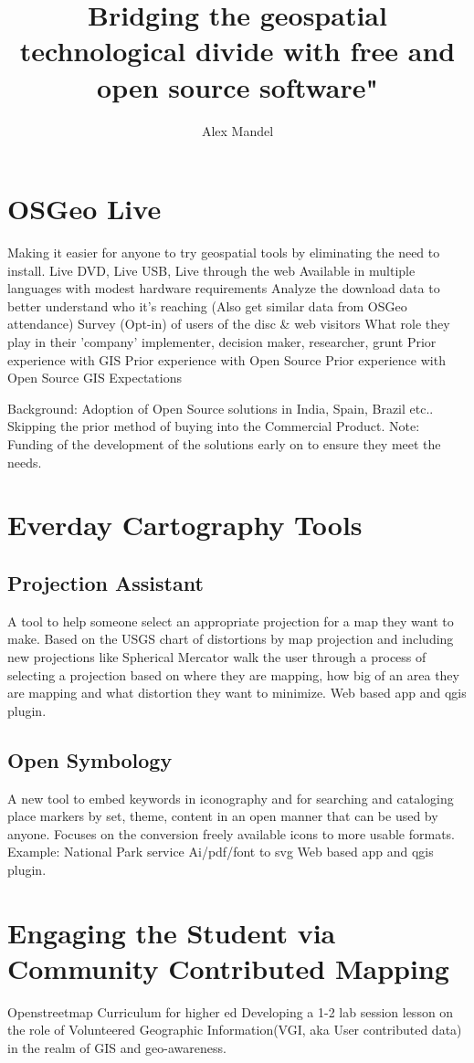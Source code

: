 \documentclass[12pt,letterpaper,draft]{article}
\author{Alex Mandel}
\title{Bridging the geospatial technological divide with free and open source software"}
\begin{document}
\section{OSGeo Live}
Making it easier for anyone to try geospatial tools by eliminating the need to install.
Live DVD, Live USB, Live through the web
Available in multiple languages with modest hardware requirements
Analyze the download data to better understand who it's reaching (Also get similar data from OSGeo attendance)
Survey (Opt-in) of users of the disc \& web visitors
What role they play in their 'company' implementer, decision maker, researcher, grunt
Prior experience with GIS
Prior experience with Open Source
Prior experience with Open Source GIS
Expectations

Background: Adoption of Open Source solutions in India, Spain, Brazil etc.. Skipping the prior method of buying into the Commercial Product.
Note: Funding of the development of the solutions early on to ensure they meet the needs.

\section{Everday Cartography Tools}

\subsection{Projection Assistant}
A tool to help someone select an appropriate projection for a map they want to make. Based on the USGS chart of distortions by map projection and including new projections like Spherical Mercator walk the user through a process of selecting a projection based on where they are mapping, how big of an area they are mapping and what distortion they want to minimize.
Web based app and qgis plugin.


\subsection{Open Symbology}
A new tool to embed keywords in iconography and for searching and cataloging place markers by set, theme, content in an open manner that can be used by anyone.
Focuses on the conversion freely available icons to more usable formats.
Example: National Park service Ai/pdf/font to svg
Web based app and qgis plugin.

\section{Engaging the Student via Community Contributed Mapping}
Openstreetmap Curriculum for higher ed
	Developing a 1-2 lab session lesson on the role of Volunteered Geographic Information(VGI, aka User contributed data) in the realm of GIS and geo-awareness.
\end{document}
